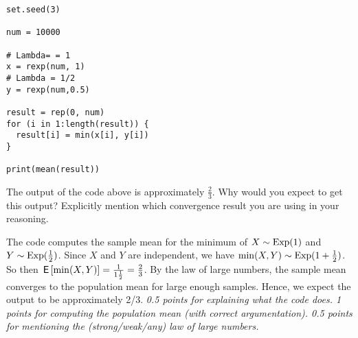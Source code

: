 \begin{verbatim}
set.seed(3)

num = 10000

# Lambda= = 1
x = rexp(num, 1)
# Lambda = 1/2
y = rexp(num,0.5)

result = rep(0, num)
for (i in 1:length(result)) {
  result[i] = min(x[i], y[i])
}

print(mean(result))
\end{verbatim}

\begin{exercise}[2]
The output of the code above is approximately $\frac{2}{3}$. Why would you expect to get this output? Explicitly mention which convergence result you are using in your reasoning.
\begin{solution}
The code computes the sample mean for the minimum of $X \sim \mathrm{Exp}(1)$ and $Y \sim \mathrm{Exp}(\frac{1}{2})$. Since $X$ and $Y$ are independent, we have $\min(X,Y) \sim \mathrm{Exp}(1+\frac{1}{2})$. So then $\,\mathsf{E}\left[\min(X,Y)\right] = \frac{1}{1\frac{1}{2}} = \frac{2}{3}$. By the law of large numbers, the sample mean converges to the population mean for large enough samples. Hence, we expect the output to be approximately 2/3.
\textit{0.5 points for explaining what the code does. 1 points for  computing the population mean (with correct argumentation). 0.5 points for mentioning the (strong/weak/any) law of large numbers.}
\end{solution}
\end{exercise}
